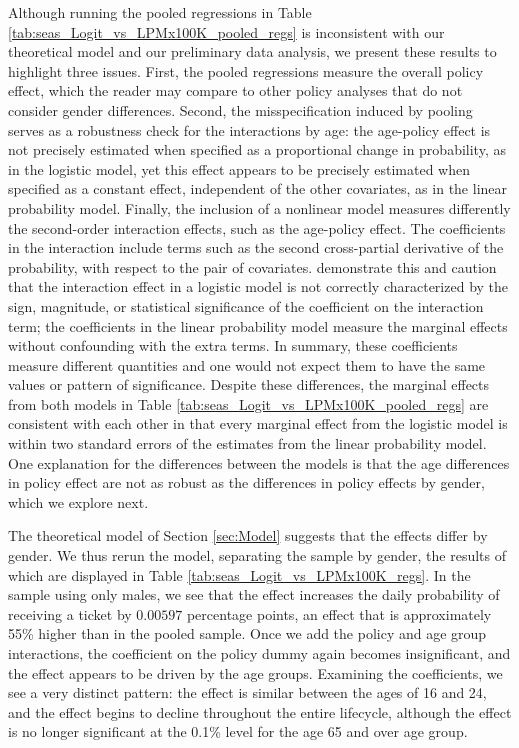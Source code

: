Although running the pooled regressions in 
Table \ref{tab:seas_Logit_vs_LPMx100K_pooled_regs}
is inconsistent with our theoretical model and our preliminary data analysis, 
we present these results to highlight three issues. 
% 
First, the pooled regressions measure the overall policy effect, 
which the reader may compare to other policy analyses that do not
consider gender differences. 
% 
Second, the misspecification induced by pooling serves as a robustness check
for the interactions by age: 
the age-policy effect is not precisely estimated when specified as 
a proportional change in probability, 
as in the logistic model, 
yet this effect appears to be precisely estimated when specified as 
a constant effect, independent of the other covariates, 
as in the linear probability model.
% 
Finally, the inclusion of a nonlinear model measures 
differently the second-order interaction effects, such as the age-policy effect.
% 
The coefficients in the interaction
include terms such as the second cross-partial derivative 
of the probability, with respect to the pair of covariates. 
%
\citet{ainorton2003} demonstrate this and caution that 
 the interaction effect in a logistic model 
is not correctly characterized by the
sign, magnitude, or statistical significance of the coefficient on the
interaction term;
the coefficients in the linear probability model measure the marginal effects
without confounding with the extra terms. 
% 
In summary, these coefficients measure different quantities
and one would not expect them to have the same values 
or pattern of significance. 
% 
Despite these differences, the marginal effects from both models 
in Table \ref{tab:seas_Logit_vs_LPMx100K_pooled_regs}
%
are consistent with each other in that every marginal effect 
from the logistic model is within two standard errors
of the estimates from the linear probability model.
% 
One explanation for the differences between the models 
is that the age differences in policy effect are not as robust
as the differences in policy effects by gender, which we explore next. 


The theoretical model of Section \ref{sec:Model} 
suggests that the effects differ by gender. 
We thus rerun the model, separating the sample by gender, 
the results of which are displayed in 
Table \ref{tab:seas_Logit_vs_LPMx100K_regs}.
In the sample using only males, 
we see that the effect increases the daily probability of receiving a ticket by $0.00597$ 
percentage points, an effect that is approximately 55\% higher than in the pooled sample. 
Once we add the policy and age group interactions, 
the coefficient on the policy dummy again becomes insignificant, 
and the effect appears to be driven by the age groups. 
Examining the coefficients, we see a very distinct pattern: 
the effect is similar between the ages of 16 and 24, 
and the effect begins to decline throughout the entire lifecycle, 
although the effect is no longer significant at the 0.1\% level for the age 65 and over age group.

